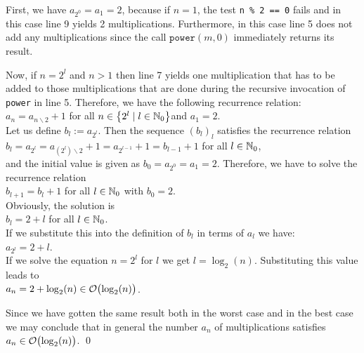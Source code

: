 First, we have $a_{2^0} = a_1 = 2$, because if $n = 1$, the test \texttt{n \% 2 == 0} fails and in
this case line 9 yields 2 multiplications.  Furthermore, in this case
line 5 does not add any multiplications since the call $\mathtt{power}(m,0)$ immediately returns its
result.

Now, if $n = 2^l$ and $n > 1$ then line 7 yields one multiplication that 
has to be added to those multiplications that are done during the recursive invocation of
\texttt{power} in line 5.  Therefore, we have the following recurrence relation:
 \\[0.2cm]
\hspace*{1.3cm} $a_n = a_{n \backslash 2} + 1$ \qquad for all $n \in \left\{2^l \mid l \in {\mathbb N}_0\right\}$\quad and
$a_1 = 2$. 
\\[0.2cm]
Let us define $b_l := a_{2^l}$.  Then the sequence $(b_l)_l$ satisfies the recurrence relation
 \\[0.2cm]
\hspace*{1.3cm} 
$b_l = a_{2^l} = a_{(2^l) \backslash 2} + 1 = a_{2^{l-1}} + 1 = b_{l-1} + 1$ \qquad for all $l\in{\mathbb N}_0$, \\[0.2cm]
and the initial value is given as $b_0 = a_{2^0} = a_1 = 2$.
Therefore, we have to solve the recurrence relation 
\\[0.2cm]
\hspace*{1.3cm}
 $b_{l+1} = b_l + 1$ \qquad for all $l \in {\mathbb N}_0$ \quad with $b_0 = 2$.\\[0.2cm]
Obviously, the solution is \\[0.2cm]
\hspace*{1.3cm} $b_l = 2 + l$ \qquad for all $l\in{\mathbb N}_0$.
\\[0.2cm]
If we substitute this into the definition of $b_l$ in terms of $a_l$ we have: \\[0.2cm]
\hspace*{1.3cm}
$a_{2^l} = 2 + l$. 
\\[0.2cm]
If we solve the equation $n = 2^l$ for  $l$ we get $l =
\log_2(n)$. Substituting this value leads to
\\[0.2cm]
\hspace*{1.3cm}
 $a_n = 2 + \log_2(n) \in \mathcal{O}\bigl(\log_2(n)\bigr)$.
\vspace*{0.3cm}

Since we have gotten the same result both in the worst case and in the best case we may conclude
that in general the number $a_n$ of multiplications satisfies 
\\[0.2cm]
\hspace*{1.3cm} 
$a_n \in \mathcal{O}\bigl(\log_2(n)\bigr)$. \qed

